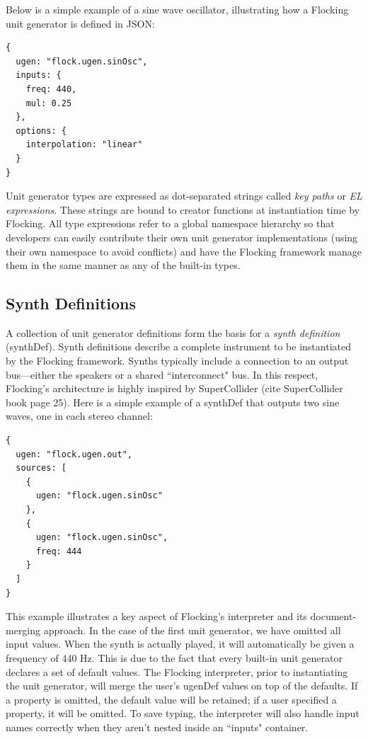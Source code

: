 \documentclass{article}
\begin{document}
Below is a simple example of a sine wave oscillator, illustrating how a Flocking unit generator is defined in JSON:

\begin{verbatim}
{
  ugen: "flock.ugen.sinOsc",
  inputs: {
    freq: 440,
    mul: 0.25
  },
  options: {
    interpolation: "linear"
  }
}
\end{verbatim}

Unit generator types are expressed as dot-separated strings called {\it key paths} or {\it EL expressions}. These strings are bound to creator functions at instantiation time by Flocking. All type expressions refer to a global namespace hierarchy so that developers can easily contribute their own unit generator implementations (using their own namespace to avoid conflicts) and have the Flocking framework manage them in the same manner as any of the built-in types.

\subsection{Synth Definitions}

A collection of unit generator definitions form the basis for a {\it synth definition} (synthDef). Synth definitions describe a complete instrument to be instantiated by the Flocking framework. Synths typically include a connection to an output bus---either the speakers or a shared ``interconnect" bus. In this respect, Flocking's architecture is highly inspired by SuperCollider (cite SuperCollider book page 25). Here is a simple example of a synthDef that outputs two sine waves, one in each stereo channel:

\begin{verbatim}
{
  ugen: "flock.ugen.out",
  sources: [
    {
      ugen: "flock.ugen.sinOsc"
    },
    {
      ugen: "flock.ugen.sinOsc",
      freq: 444
    }
  ]
}
\end{verbatim}

This example illustrates a key aspect of Flocking's interpreter and its document-merging approach. In the case of the first unit generator, we have omitted all input values. When the synth is actually played, it will automatically be given a frequency of 440 Hz. This is due to the fact that every built-in unit generator declares a set of default values. The Flocking interpreter, prior to instantiating the unit generator, will merge the user's ugenDef values on top of the defaults. If a property is omitted, the default value will be retained; if a user specified a property, it will be omitted. To save typing, the interpreter will also handle input names correctly when they aren't nested inside an ``inputs" container.
\end{document}
